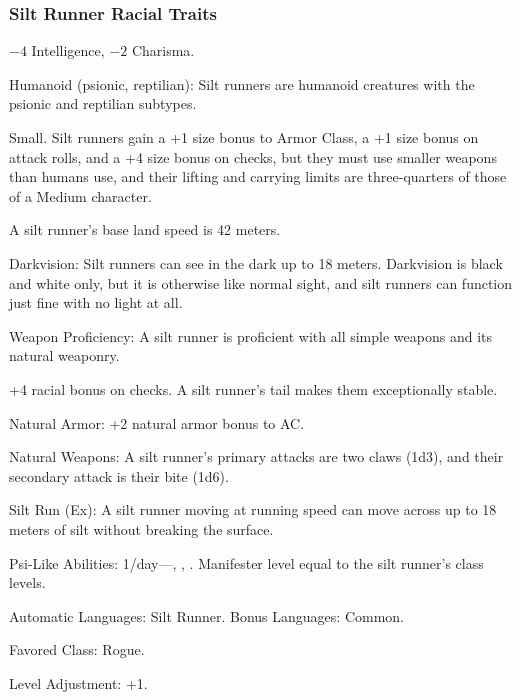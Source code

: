 \subsubsection{Silt Runner Racial Traits}
\begin{itemize*}
    \item $-4$ Intelligence, $-2$ Charisma.
    \item Humanoid (psionic, reptilian): Silt runners are humanoid creatures with the psionic and reptilian subtypes.
    \item Small. Silt runners gain a +1 size bonus to Armor Class, a +1 size bonus on attack rolls, and a +4 size bonus on  checks, but they must use smaller weapons than humans use, and their lifting and carrying limits are three-quarters of those of a Medium character.
    \item A silt runner's base land speed is 42 meters.
    \item Darkvision: Silt runners can see in the dark up to 18 meters. Darkvision is black and white only, but it is otherwise like normal sight, and silt runners can function just fine with no light at all.
    \item Weapon Proficiency: A silt runner is proficient with all simple weapons and its natural weaponry.
    \item +4 racial bonus on  checks. A silt runner's tail makes them exceptionally stable.
    \item Natural Armor: +2 natural armor bonus to AC.
    \item Natural Weapons: A silt runner's primary attacks are two claws (1d3), and their secondary attack is their bite (1d6).
    \item Silt Run (Ex): A silt runner moving at running speed can move across up to 18 meters of silt without breaking the surface.
    \item Psi-Like Abilities: 1/day---, , . Manifester level equal to the silt runner's class levels.
    \item Automatic Languages: Silt Runner. Bonus Languages: Common.
    \item Favored Class: Rogue.
    \item Level Adjustment: +1.
\end{itemize*}
